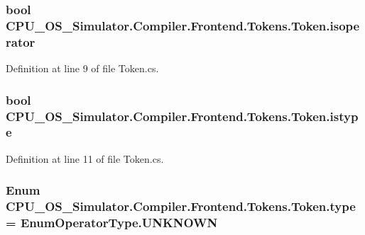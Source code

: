 \subsubsection[{isoperator}]{\setlength{\rightskip}{0pt plus 5cm}bool C\+P\+U\+\_\+\+O\+S\+\_\+\+Simulator.\+Compiler.\+Frontend.\+Tokens.\+Token.\+isoperator\hspace{0.3cm}{\ttfamily [private]}}\label{class_c_p_u___o_s___simulator_1_1_compiler_1_1_frontend_1_1_tokens_1_1_token_a4de08fda7aa63cfac40f564c49bcdcb8}


Definition at line 9 of file Token.\+cs.

\hypertarget{class_c_p_u___o_s___simulator_1_1_compiler_1_1_frontend_1_1_tokens_1_1_token_a3d8b092bc7201b819ada49cb10ea01b0}{}
\subsubsection[{istype}]{\setlength{\rightskip}{0pt plus 5cm}bool C\+P\+U\+\_\+\+O\+S\+\_\+\+Simulator.\+Compiler.\+Frontend.\+Tokens.\+Token.\+istype\hspace{0.3cm}{\ttfamily [private]}}\label{class_c_p_u___o_s___simulator_1_1_compiler_1_1_frontend_1_1_tokens_1_1_token_a3d8b092bc7201b819ada49cb10ea01b0}


Definition at line 11 of file Token.\+cs.

\hypertarget{class_c_p_u___o_s___simulator_1_1_compiler_1_1_frontend_1_1_tokens_1_1_token_a7ec4dbbde477cd373f8135f0c843a346}{}
\subsubsection[{type}]{\setlength{\rightskip}{0pt plus 5cm}Enum C\+P\+U\+\_\+\+O\+S\+\_\+\+Simulator.\+Compiler.\+Frontend.\+Tokens.\+Token.\+type = {\bf Enum\+Operator\+Type.\+U\+N\+K\+N\+O\+W\+N}\hspace{0.3cm}{\ttfamily [protected]}}\label{class_c_p_u___o_s___simulator_1_1_compiler_1_1_frontend_1_1_tokens_1_1_token_a7ec4dbbde477cd373f8135f0c843a346}


